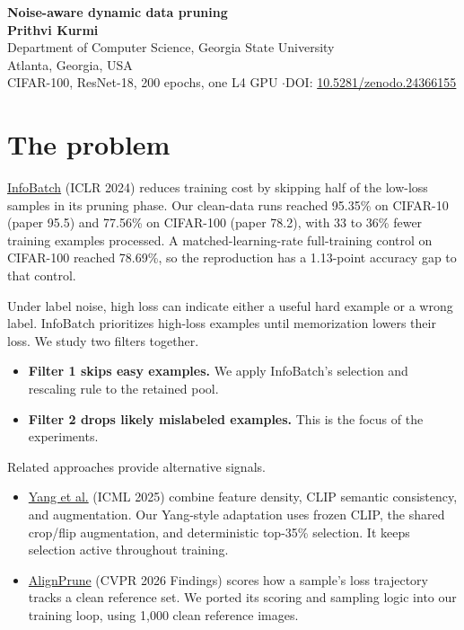 \documentclass[10pt]{article}
\begin{document}
{\Large\bfseries Noise-aware dynamic data pruning}\\[5pt]
{\bfseries Prithvi Kurmi}\\[2pt]
{\small Department of Computer Science, Georgia State University\\
Atlanta, Georgia, USA}\\[5pt]
{\small CIFAR-100, ResNet-18, 200 epochs, one L4 GPU \quad$\cdot$\quad DOI: \href{https://doi.org/10.5281/zenodo.24366155}{10.5281/zenodo.24366155}}

\section{The problem}
\href{https://proceedings.iclr.cc/paper_files/paper/2024/hash/ad1d7a4df30a9c0c46b387815a774a84-Abstract-Conference.html}{InfoBatch} (ICLR 2024) reduces training cost by skipping half of the low-loss samples in its pruning phase. Our clean-data runs reached 95.35\% on CIFAR-10 (paper 95.5) and 77.56\% on CIFAR-100 (paper 78.2), with 33 to 36\% fewer training examples processed. A matched-learning-rate full-training control on CIFAR-100 reached 78.69\%, so the reproduction has a 1.13-point accuracy gap to that control.

Under label noise, high loss can indicate either a useful hard example or a wrong label. InfoBatch prioritizes high-loss examples until memorization lowers their loss. We study two filters together.
\begin{itemize}
\item \textbf{Filter 1 skips easy examples.} We apply InfoBatch's selection and rescaling rule to the retained pool.
\item \textbf{Filter 2 drops likely mislabeled examples.} This is the focus of the experiments.
\end{itemize}
Related approaches provide alternative signals.
\begin{itemize}
\item \href{https://proceedings.mlr.press/v267/yang25as.html}{Yang et al.} (ICML 2025) combine feature density, CLIP semantic consistency, and augmentation. Our Yang-style adaptation uses frozen CLIP, the shared crop/flip augmentation, and deterministic top-35\% selection. It keeps selection active throughout training.
\item \href{https://arxiv.org/abs/2604.07306}{AlignPrune} (CVPR 2026 Findings) scores how a sample's loss trajectory tracks a clean reference set. We ported its scoring and sampling logic into our training loop, using 1{,}000 clean reference images.
\end{itemize}
\end{document}
